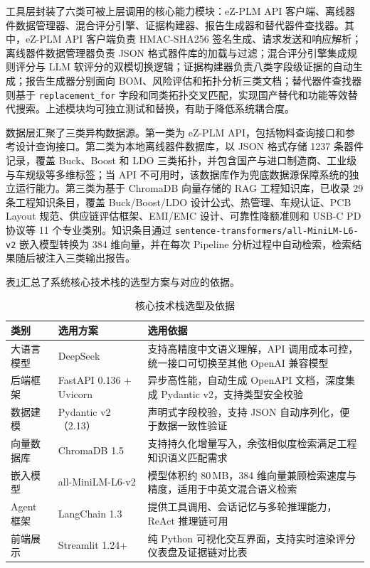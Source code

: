 工具层封装了六类可被上层调用的核心能力模块：eZ-PLM API 客户端、离线器件数据管理器、混合评分引擎、证据构建器、报告生成器和替代器件查找器。其中，eZ-PLM API 客户端负责 HMAC-SHA256 签名生成、请求发送和响应解析；离线器件数据管理器负责 JSON 格式器件库的加载与过滤；混合评分引擎集成规则评分与 LLM 软评分的双模切换逻辑；证据构建器负责八类字段级证据的自动生成；报告生成器分别面向 BOM、风险评估和拓扑分析三类文档；替代器件查找器则基于 \texttt{replacement\_for} 字段和同类拓扑交叉匹配，实现国产替代和功能等效替代搜索。上述模块均可独立测试和替换，有助于降低系统耦合度。

数据层汇聚了三类异构数据源。第一类为 eZ-PLM API，包括物料查询接口和参考设计查询接口。第二类为本地离线器件数据库，以 JSON 格式存储 1237 条器件记录，覆盖 Buck、Boost 和 LDO 三类拓扑，并包含国产与进口制造商、工业级与车规级等多维标签；当 API 不可用时，该数据库作为兜底数据源保障系统的独立运行能力。第三类为基于 ChromaDB 向量存储的 RAG 工程知识库，已收录 29 条工程知识条目，覆盖 Buck/Boost/LDO 设计公式、热管理、车规认证、PCB Layout 规范、供应链评估框架、EMI/EMC 设计、可靠性降额准则和 USB-C PD 协议等 11 个专业类别。知识条目通过 \texttt{sentence-transformers/all-MiniLM-L6-v2} 嵌入模型转换为 384 维向量，并在每次 Pipeline 分析过程中自动检索，检索结果随后被注入三类输出报告。

表\ref{tab:tech}汇总了系统核心技术栈的选型方案与对应的依据。
\begin{table}[htbp]
\centering
\caption{核心技术栈选型及依据}
\label{tab:tech}
\footnotesize
\setlength{\tabcolsep}{4pt}
\renewcommand{\arraystretch}{0.95}
\begin{tabularx}{\textwidth}{p{2cm}p{4cm}X}
\toprule
\textbf{类别} & \textbf{选用方案} & \textbf{选用依据} \\
\midrule
大语言模型 & DeepSeek & 支持高精度中文语义理解，API 调用成本可控，统一接口可切换至其他 OpenAI 兼容模型 \\
后端框架 & FastAPI 0.136 + Uvicorn & 异步高性能，自动生成 OpenAPI 文档，深度集成 Pydantic v2，支持类型安全校验 \\
数据建模 & Pydantic v2（2.13） & 声明式字段校验，支持 JSON 自动序列化，便于数据一致性验证 \\
向量数据库 & ChromaDB 1.5 & 支持持久化增量写入，余弦相似度检索满足工程知识语义匹配需求 \\
嵌入模型 & all-MiniLM-L6-v2 & 模型体积约 80\,MB，384 维向量兼顾检索速度与精度，适用于中英文混合语义检索 \\
Agent 框架 & LangChain 1.3 & 提供工具调用、会话记忆与多轮推理能力，ReAct 推理链可用 \\
前端展示 & Streamlit 1.24+ & 纯 Python 可视化交互界面，支持实时渲染评分仪表盘及证据链对比表 \\
\bottomrule
\end{tabularx}
\end{table}

